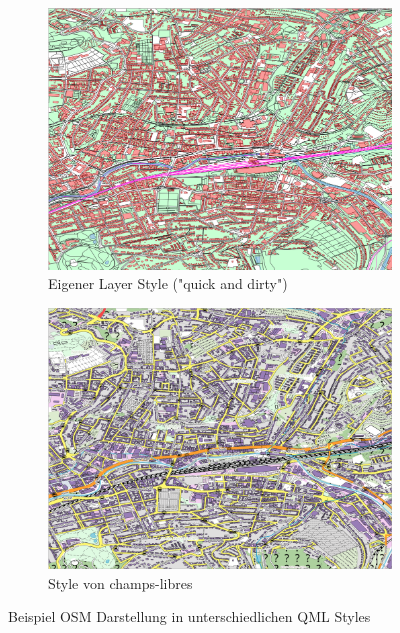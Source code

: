 			\begin{figure}[H]
				\begin{subfigure}{0.5\linewidth}
					\includegraphics[width=\linewidth]{Medien/own/screen_osm_example_style_own_quick.png}
					\caption{Eigener Layer Style ("quick and dirty")}
					\label{fig:osm_example_style_own}
				\end{subfigure}
				\begin{subfigure}{0.5\linewidth}
					\includegraphics[width=\linewidth]{Medien/own/screen_osm_example_style_champs_libres.png}
					\caption{Style von champs-libres \cite{web_gitlab_champs_libres}}
					\label{fig:osm_example_style_champs_libres}
				\end{subfigure}
				\caption{Beispiel OSM Darstellung in unterschiedlichen QML Styles}
				\label{fig:osm_example}
			\end{figure}
			
